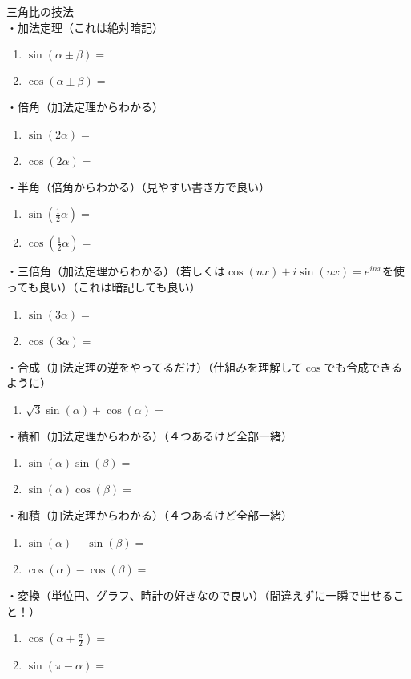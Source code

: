 \documentclass[12pt,a4paper]{jsarticle}
\begin{document}
三角比の技法\\
・加法定理（これは絶対暗記）
\begin{enumerate}
    \item $\sin(\alpha\pm\beta)=$
    \item $\cos(\alpha\pm\beta)=$
\end{enumerate}
・倍角（加法定理からわかる）
\begin{enumerate}
    \item $\sin(2\alpha)=$
    \item $\cos(2\alpha)=$
\end{enumerate}
・半角（倍角からわかる）（見やすい書き方で良い）
\begin{enumerate}
    \item $\sin\left(\frac{1}{2}\alpha\right)=$
    \item $\cos\left(\frac{1}{2}\alpha\right)=$
\end{enumerate}
・三倍角（加法定理からわかる）（若しくは$\cos(nx)+i\sin(nx)=e^{inx}$を使っても良い）（これは暗記しても良い）
\begin{enumerate}
    \item $\sin(3\alpha)=$
    \item $\cos(3\alpha)=$
\end{enumerate}
・合成（加法定理の逆をやってるだけ）（仕組みを理解して$\cos$でも合成できるように）
\begin{enumerate}
    \item $\sqrt{3}\sin(\alpha)+\cos(\alpha)=$
\end{enumerate}
・積和（加法定理からわかる）（４つあるけど全部一緒）
\begin{enumerate}
    \item $\sin(\alpha)\sin(\beta)=$
    \item $\sin(\alpha)\cos(\beta)=$
\end{enumerate}
・和積（加法定理からわかる）（４つあるけど全部一緒）
\begin{enumerate}
    \item $\sin(\alpha)+\sin(\beta)=$
    \item $\cos(\alpha)-\cos(\beta)=$
\end{enumerate}
・変換（単位円、グラフ、時計の好きなので良い）（間違えずに一瞬で出せること！）
\begin{enumerate}
    \item $\cos\left(\alpha+\frac{\pi}{2}\right)=$
    \item $\sin(\pi-\alpha)=$
\end{enumerate}
\end{document}
